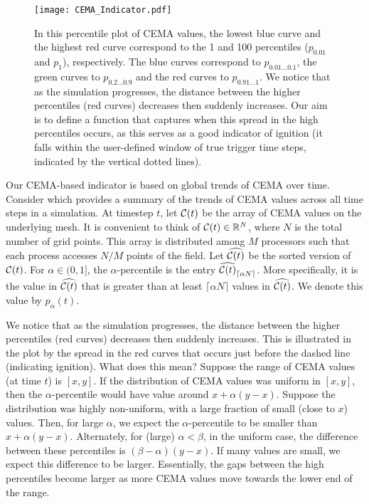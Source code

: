 \documentclass[final]{siamltex}
\newcommand{\cC}{{\cal C}}
\newcommand{\RR}{\mathbb{R}}
\newcommand{\cei}[1]{\lceil #1 \rceil}
\newcommand{\cema}{\cC}
\newcommand{\pt}{{p}}
\begin{document}
\begin{figure}[H]
\centering
\texttt{[image: CEMA\_Indicator.pdf]}
\caption{\label{fig:CEMA_indicator} 
   In this percentile plot of CEMA values, the lowest
blue curve and the highest red curve correspond to the 1 and
100 percentiles ($p_{0.01}$ and $p_{1}$), respectively. The blue curves
correspond to $p_{0.01 \ldots 0.1}$, the green curves to $p_{0.2 \ldots 0.9}$
and the red curves to $p_{0.91 \ldots 1}$. We notice that as the simulation progresses, the distance between the higher percentiles (red
curves) decreases then suddenly increases. Our aim is to define a 
function that captures when this spread in the high percentiles occurs, as this
serves as a good indicator of ignition (it falls within the user-defined window
of true trigger time steps, indicated by the vertical dotted lines).
}
\end{figure}


Our CEMA-based indicator is based on global trends of CEMA over time.
Consider  
which provides a summary of the trends of CEMA values across all time steps in a simulation. 
At timestep $t$, let $\cema(t)$ be the array of CEMA values on the underlying mesh. 
It is convenient to think of $\cema(t) \in \RR^N$, where $N$ is the total number
of grid points. This array is distributed
among $M$ processors such that each process accesses $N/M$ points of the
field.  Let $\widehat{\cema(t)}$
be the sorted version of $\cema(t)$. For $\alpha \in (0,1]$, the $\alpha$-percentile 
is the entry $\widehat{\cema(t)}_{\lceil \alpha N \rceil}$. 
More specifically, it is the value in $\widehat{\cema(t)}$ that is greater than at least $\cei{\alpha N}$
values in $\widehat{\cema(t)}$. We denote this value by $\pt_\alpha(t)$.

We notice that as the simulation progresses, the distance between the higher percentiles (red
curves) decreases then suddenly increases. This is illustrated in the plot
by the spread in the red curves that occurs just before the dashed line (indicating
ignition). What does this mean? Suppose the range of CEMA values (at time $t$)
is $[x,y]$. If the distribution of CEMA values was uniform in $[x,y]$, then the 
$\alpha$-percentile would have value around $x + \alpha(y-x)$. 
Suppose the distribution was highly non-uniform, with a large fraction
of small (close to $x$) values. Then, for large $\alpha$, we expect
the $\alpha$-percentile to be smaller than $x + \alpha(y-x)$. 
Alternately, for (large) $\alpha < \beta$, in the uniform case,
the difference between these percentiles is $(\beta-\alpha)(y-x)$.
If many values are small, we expect this difference to be larger.
Essentially, the gaps between the high percentiles become larger
as more CEMA values move towards the lower end of the range. 
 
\end{document}
